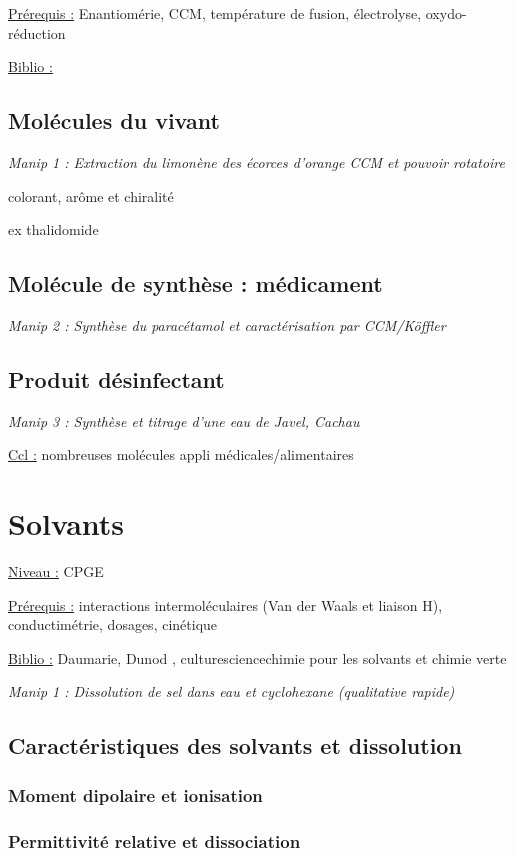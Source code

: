 \documentclass{article}%
\begin{document}
\underline{Prérequis :} Enantiomérie, CCM, température de fusion, électrolyse, oxydo-réduction

\underline{Biblio :} 
\subsection{Molécules du vivant}
\textit{Manip 1 : Extraction du limonène des écorces d'orange CCM et pouvoir rotatoire}

colorant, arôme et chiralité

ex thalidomide
\subsection{Molécule de synthèse : médicament}

\textit{Manip 2 : Synthèse du paracétamol et caractérisation par CCM/Köffler}

\subsection{Produit désinfectant}

\textit{Manip 3 : Synthèse et titrage d'une eau de Javel, Cachau}

\underline{Ccl :} nombreuses molécules appli médicales/alimentaires

\section{Solvants}
\underline{Niveau :} CPGE 

\underline{Prérequis :} interactions intermoléculaires (Van der Waals et liaison H), conductimétrie, dosages, cinétique

\underline{Biblio :} Daumarie, Dunod , culturesciencechimie pour les solvants et chimie verte

\textit{Manip 1 : Dissolution de sel dans eau et cyclohexane (qualitative rapide)}
\subsection{Caractéristiques des solvants et dissolution}
\subsubsection{Moment dipolaire et ionisation}
\subsubsection{Permittivité relative et dissociation}
\end{document}
